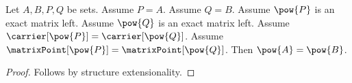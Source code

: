 

\begin{proposition}\label{exact_record_theorem_equality_no_alias}
    Let $A,B,P,Q$ be sets.
    Assume $P=A$.
    Assume $Q=B$.
    Assume $\pow{P}$ is an exact matrix left.
    Assume $\pow{Q}$ is an exact matrix left.
    Assume $\carrier[\pow{P}]=\carrier[\pow{Q}]$.
    Assume $\matrixPoint[\pow{P}]=\matrixPoint[\pow{Q}]$.
    Then $\pow{A}=\pow{B}$.
\end{proposition}
\begin{proof}
    Follows by structure extensionality.
\end{proof}
